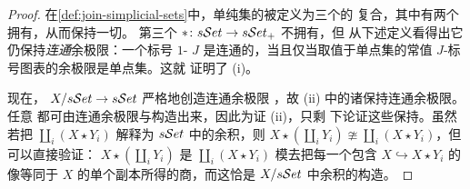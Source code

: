 \begin{proof}
在\cref{def:join-simplicial-sets}中，单纯集的\trJoin{}被定义为三个\trFunctor{}的%
复合，其中有两个\trFunctor{}拥有\trRightAdjoint，从而保持一切\trColimit。%
第三个\trFunctor{} $\ast\colon s\mathcal{S}et\to s\mathcal{S}et_{+}$ 不拥有\trRightAdjoint，但%
从下述定义看得出它仍保持\emph{连通}余极限：一个标号 $1$-\trCategory{} $J$
是连通的，当且仅当取值于单点集的常值 $J$-标号图表的余极限是单点集。这就%
证明了 (i)。

现在，\trForgetfulFunctor{} $X/s\mathcal{S}et\to s\mathcal{S}et$ 严格地创造连通余极限%
\cite[3.3.8]{bib104}，故 (ii) 中的诸\trJoin\trFunctor{}保持连通余极限。任意%
\trColimit{}都可由连通余极限与\trCoproduct{}构造出来，因此为证 (ii)，只剩%
下论证这些\trFunctor{}保持\trCoproduct。虽然若把%
$\coprod_{i}(X\star Y_{i})$ 解释为 $s\mathcal{S}et$ 中的余积，则%
$X\star(\coprod_{i}Y_{i})\ncong\coprod_{i}(X\star Y_{i})$，但可以直接验证：%
$X\star(\coprod_{i}Y_{i})$ 是 $\coprod_{i}(X\star Y_{i})$ 模去把每一个包含%
$X\hookrightarrow X\star Y_{i}$ 的像等同于 $X$ 的单个副本所得的商，而这恰是%
$X/s\mathcal{S}et$ 中余积的构造。
\end{proof}

